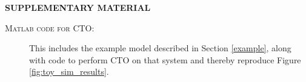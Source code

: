 \documentclass[12pt]{article}
\begin{document}
\bigskip
\begin{center}
{\large\bf SUPPLEMENTARY MATERIAL}
\end{center}

\begin{description}


\item[\scshape{Matlab} code for CTO:] This includes the example model described in Section \ref{example}, along with code to perform CTO on that system and thereby reproduce Figure \ref{fig:toy_sim_results}.


%

\end{description}




\end{document}
